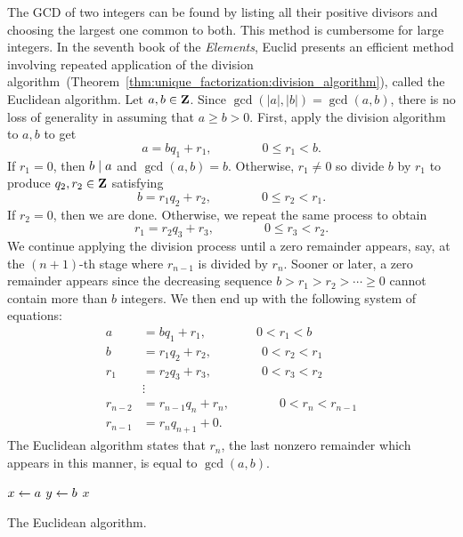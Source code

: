 The GCD of two integers can be found by listing all their positive
divisors and choosing the largest one common to both. This method is
cumbersome for large integers. In the seventh book of the
\emph{Elements}, Euclid presents an efficient method involving
repeated application of the division
algorithm~(Theorem~\ref{thm:unique_factorization:division_algorithm}),
called the Euclidean algorithm. Let $a,b \in \mathbf{Z}$. Since
$\gcd(|a|, |b|) = \gcd(a,b)$, there is no loss of generality in
assuming that $a \geq b > 0$. First, apply the division algorithm to
$a,b$ to get
\[
a
=
bq_1 + r_1, \qquad\qquad 0 \leq r_1 < b.
\]
If $r_1 = 0$, then $b \;|\; a$ and $\gcd(a,b) = b$. Otherwise,
$r_1 \neq 0$ so divide $b$ by $r_1$ to produce
$q_2, r_2 \in \mathbf{Z}$ satisfying
\[
b
=
r_1 q_2 + r_2, \qquad\qquad 0 \leq r_2 < r_1.
\]
If $r_2 = 0$, then we are done. Otherwise, we repeat the same process
to obtain
\[
r_1
=
r_2 q_3 + r_3, \qquad\qquad 0 \leq r_3 < r_2.
\]
We continue applying the division process until a zero remainder
appears, say, at the $(n+1)$-th stage where $r_{n-1}$ is divided by
$r_n$. Sooner or later, a zero remainder appears since the decreasing
sequence $b > r_1 > r_2 > \cdots \geq 0$ cannot contain more than $b$
integers. We then end up with the following system of equations:
%
\begin{align*}
a &= bq_1 + r_1, \qquad\qquad 0 < r_1 < b \\
b &= r_1 q_2 + r_2, \qquad\qquad 0 < r_2 < r_1 \\
r_1 &= r_2 q_3 + r_3, \qquad\qquad 0 < r_3 < r_2 \\
& \vdots \\
r_{n-2} &= r_{n-1} q_n + r_n, \qquad\qquad 0 < r_n < r_{n-1} \\
r_{n-1} &= r_n q_{n+1} + 0.
\end{align*}
%
The Euclidean algorithm states that $r_n$, the last nonzero remainder
which appears in this manner, is equal to $\gcd(a,b)$.

\begin{algorithm}[!htpb]
\dontprintsemicolon
\BlankLine
$x \leftarrow a$\;
$y \leftarrow b$\;
\Return $x$
\caption{The Euclidean algorithm.}
\label{alg:unique_factorization:Euclidean_algorithm}
\end{algorithm}

